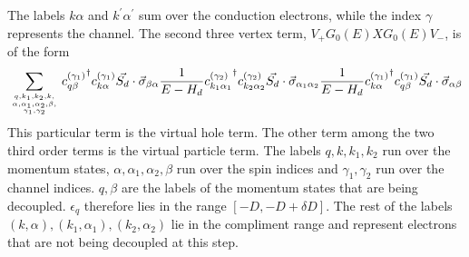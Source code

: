 \documentclass[twoside,11pt]{report}
\numberwithin{equation}{section}
\begin{document}
The labels \(k\alpha\) and \(k^\prime\alpha^\prime\) sum over the conduction electrons, while the index \(\gamma\) represents the channel. The second three vertex term, \(V_+G_0(E)XG_0(E)V_-\), is of the form
\begin{equation}\begin{aligned}
	\sum_{q,k_1,k_2,k,\atop{\alpha,\alpha_1,\alpha_2,\beta,\atop{\gamma_1,\gamma_2}}}{c^{(\gamma_1)}_{q\beta}}^\dagger {c^{(\gamma_1)}_{k\alpha}}\vec{S_d}\cdot\vec{\sigma}_{\beta \alpha} \frac{1}{E - H_d} {c^{(\gamma_2)}_{k_1 \alpha_1}}^\dagger c_{k_2 \alpha_2}^{(\gamma_2)}\vec{S_d}\cdot\vec{\sigma}_{\alpha_1 \alpha_2} \frac{1}{E - H_d} {c^{(\gamma_1)}_{k\alpha}}^\dagger {c^{(\gamma_1)}_{q\beta}}\vec{S_d}\cdot\vec{\sigma}_{\alpha \beta}
\end{aligned}\end{equation}
This particular term is the virtual hole term. The other term among the two third order terms is the virtual particle term. The labels \(q,k,k_1,k_2\) run over the momentum states, \(\alpha,\alpha_1,\alpha_2,\beta\) run over the spin indices and \(\gamma_1,\gamma_2\) run over the channel indices. \(q,\beta\) are the labels of the momentum states that are being decoupled. \(\epsilon_q\) therefore lies in the range \(\left[-D, -D + \delta D\right] \). The rest of the labels \((k,\alpha),(k_1,\alpha_1),(k_2,\alpha_2)\) lie in the compliment range and represent electrons that are not being decoupled at this step.
\end{document}
